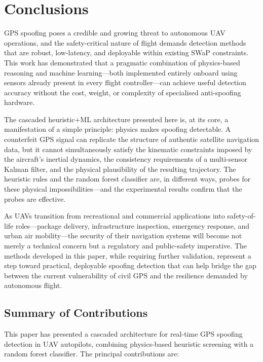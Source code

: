 \documentclass[electronics,article,accept,moreauthors]{Definitions/mdpi}
\begin{document}
\section{Conclusions}
\label{sec:conclusions}

GPS spoofing poses a credible and growing threat to autonomous UAV operations, and the safety-critical nature of flight demands detection methods that are robust, low-latency, and deployable within existing SWaP constraints. This work has demonstrated that a pragmatic combination of physics-based reasoning and machine learning---both implemented entirely onboard using sensors already present in every flight controller---can achieve useful detection accuracy without the cost, weight, or complexity of specialised anti-spoofing hardware.

The cascaded heuristic+ML architecture presented here is, at its core, a manifestation of a simple principle: physics makes spoofing detectable. A counterfeit GPS signal can replicate the structure of authentic satellite navigation data, but it cannot simultaneously satisfy the kinematic constraints imposed by the aircraft's inertial dynamics, the consistency requirements of a multi-sensor Kalman filter, and the physical plausibility of the resulting trajectory. The heuristic rules and the random forest classifier are, in different ways, probes for these physical impossibilities---and the experimental results confirm that the probes are effective.

As UAVs transition from recreational and commercial applications into safety-of-life roles---package delivery, infrastructure inspection, emergency response, and urban air mobility---the security of their navigation systems will become not merely a technical concern but a regulatory and public-safety imperative. The methods developed in this paper, while requiring further validation, represent a step toward practical, deployable spoofing detection that can help bridge the gap between the current vulnerability of civil GPS and the resilience demanded by autonomous flight.

\subsection{Summary of Contributions}

This paper has presented a cascaded architecture for real-time GPS spoofing detection in UAV autopilots, combining physics-based heuristic screening with a random forest classifier. The principal contributions are:
\end{document}
